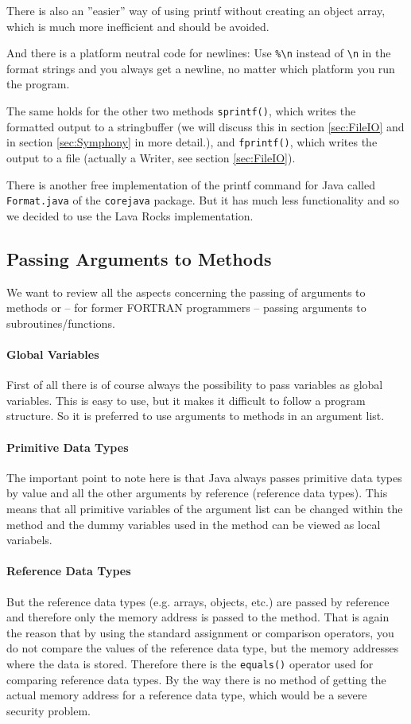 There is also an ''easier'' way of using printf without creating
an object array, which is much more inefficient and should be avoided.

And there is a platform neutral code for newlines: Use \verb|%\n| instead
of \verb|\n| in the format strings and you always get a newline,
no matter which platform you run the program.

The same holds for the other two methods \verb|sprintf()|, which writes
the formatted output to a stringbuffer (we will discuss this in section
\ref{sec:FileIO} and in section \ref{sec:Symphony} in more detail.),
and \verb|fprintf()|, which writes the output to a file (actually a
Writer, see section \ref{sec:FileIO}).

There is another free implementation of the printf command for
Java called \verb|Format.java| of the \verb|corejava| package.
But it has much less functionality and so we decided to use
the Lava Rocks implementation.

\subsection{Passing Arguments to Methods}
We want to review all the aspects concerning the passing of
arguments to methods or -- for former FORTRAN programmers --
passing arguments to subroutines/functions.

\paragraph{Global Variables}
First of all there is of course always the possibility to 
pass variables as global variables. This is easy to use,
but it makes it difficult to follow a program structure.
So it is preferred to use arguments to methods in an
argument list.

\paragraph{Primitive Data Types}
The important point to note here is that Java always
passes primitive data types by value and all the other
arguments by reference (reference data types). 
This means that all primitive
variables of the argument list can be changed within
the method and the dummy variables used in the method 
can be viewed as local variabels.

\paragraph{Reference Data Types}
But the reference data types (e.g. arrays, objects, etc.)
are passed by reference and therefore only the memory
address is passed to the method. That is again the reason that
by using the standard assignment or comparison operators,
you do not compare the values of the reference data type, but
the memory addresses where the data is stored. Therefore there
is the \verb|equals()| operator used for comparing reference data
types. By the way there is no method
of getting the actual memory address for a reference data type,
which would be a severe security problem.

